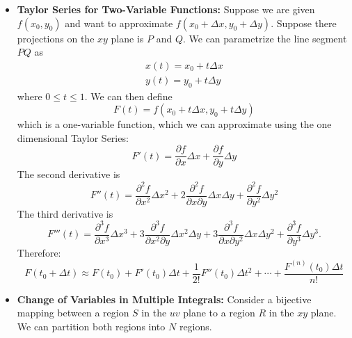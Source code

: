 \begin{itemize}
\begin{equation}
    \end{equation}
    \item \textbf{Taylor Series for Two-Variable Functions:} Suppose we are given $f(x_0,y_0)$ and want to approximate $f(x_0+\Delta x,y_0+\Delta y).$ Suppose there projections on the $xy$ plane is $P$ and $Q$. We can parametrize the line segment $PQ$ as 
    \begin{align}
        x(t) = x_0 + t\Delta x \\ 
        y(t) = y_0 + t\Delta y
    \end{align}
    where $0 \le t \le 1$. We can then define 
    \begin{equation}
        F(t) = f(x_0+t\Delta x,y_0+t\Delta y)
    \end{equation}
    which is a one-variable function, which we can approximate using the one dimensional Taylor Series: 
    \begin{equation}
        F'(t) = \frac{\partial f}{\partial x}\Delta x + \frac{\partial f}{\partial y}\Delta y
    \end{equation}
    The second derivative is 
    \begin{equation}
        F''(t)  = \frac{\partial^2 f}{\partial x^2}\Delta x^2 + 2\frac{\partial^2 f}{\partial x\partial y}\Delta x\Delta y + \frac{\partial^2 f}{\partial y^2}\Delta y^2
    \end{equation}
    The third derivative is
    \begin{equation}
        F'''(t) = \frac{\partial^3f}{\partial x^3}\Delta x^3 + 3\frac{\partial^3 f}{\partial x^2\partial y}\Delta x^2\Delta y + 3\frac{\partial^3 f}{\partial x\partial y^2}\Delta x\Delta y^2 + \frac{\partial^3f}{\partial y^3}\Delta y^3 .
    \end{equation}
    Therefore: 
    \begin{equation}
        F(t_0+\Delta t)\approx F(t_0) + F'(t_0)\Delta t + \frac{1}{2!}F''(t_0)\Delta t^2 + \cdots + \frac{F^{(n)}(t_0)\Delta t}{n!}
    \end{equation}
    \item \textbf{Change of Variables in Multiple Integrals:} Consider a bijective mapping between a region $S$ in the $uv$ plane to a region $R$ in the $xy$ plane. We can partition both regions into $N$ regions.
    

\end{itemize}
